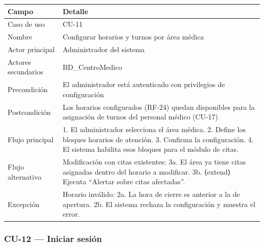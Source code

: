 \documentclass[11pt,a4paper]{article}
\begin{document}
	\begin{longtable}{p{} p{} }
		
		
		\toprule
		\textbf{Campo} &
		\textbf{Detalle}  \\
		\midrule
		\endhead
		
		Caso de uso & CU-11 \\
		Nombre & Configurar horarios y turnos por área médica \\
		Actor principal & Administrador del sistema \\
		Actores secundarios & BD\_CentroMedico \\
		Precondición & El administrador está autenticado con privilegios de configuración \\
		Postcondición & Los horarios configurados (RF-24) quedan disponibles para la asignación de turnos del personal médico (CU-17) \\
		Flujo principal & 1. El administrador selecciona el área médica. 2. Define los bloques horarios de atención. 3. Confirma la configuración. 4. El sistema habilita esos bloques para el módulo de citas. \\
		Flujo alternativo & Modificación con citas existentes: 3a. El área ya tiene citas asignadas dentro del horario a modificar. 3b. ⟨extend⟩ Ejecuta ``Alertar sobre citas afectadas''. \\
		Excepción & Horario inválido: 2a. La hora de cierre es anterior a la de apertura. 2b. El sistema rechaza la configuración y muestra el error. \\
		\bottomrule
		
	\end{longtable}
	
	\subsubsection{CU-12 --- Iniciar sesión}
	
\end{document}
